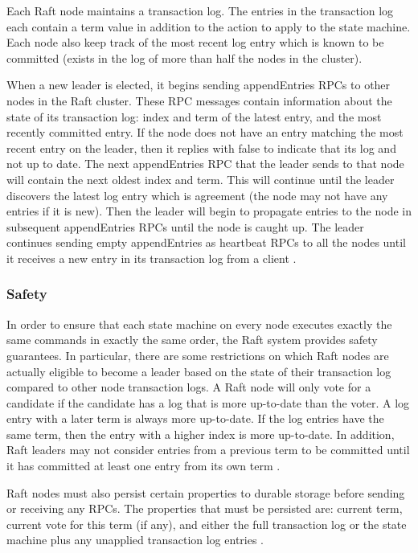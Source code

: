 \documentclass[9pt]{extarticle}
\begin{document}
\begin{multicols}{2}
Each Raft node maintains a transaction log. The entries in the
transaction log each contain a term value in addition to the action to
apply to the state machine. Each node also keep track of the most
recent log entry which is known to be committed (exists in the log of
more than half the nodes in the cluster).

When a new leader is elected, it begins sending appendEntries RPCs
to other nodes in the Raft cluster. These RPC messages contain
information about the state of its transaction log: index and term of
the latest entry, and the most recently committed entry. If the node
does not have an entry matching the most recent entry on the leader,
then it replies with false to indicate that its log and not up to
date. The next appendEntries RPC that the leader sends to that
node will contain the next oldest index and term. This will continue
until the leader discovers the latest log entry which is agreement
(the node may not have any entries if it is new). Then the leader will
begin to propagate entries to the node in subsequent appendEntries
RPCs until the node is caught up. The leader continues sending
empty appendEntries as heartbeat RPCs to all the nodes until it
receives a new entry in its transaction log from a client
\cite[Section~3.5]{raft_thesis:ongaro14}.

\subsubsection{Safety}

In order to ensure that each state machine on every node executes
exactly the same commands in exactly the same order, the Raft system
provides safety guarantees. In particular, there are some restrictions
on which Raft nodes are actually eligible to become a leader based on
the state of their transaction log compared to other node transaction
logs. A Raft node will only vote for a candidate if the candidate has
a log that is more up-to-date than the voter. A log entry with a later
term is always more up-to-date. If the log entries have the same term,
then the entry with a higher index is more up-to-date. In addition,
Raft leaders may not consider entries from a previous term to be
committed until it has committed at least one entry from its own
term
\cite[Section~3.6]{raft_thesis:ongaro14}.

Raft nodes must also persist certain properties to durable storage
before sending or receiving any RPCs. The properties that must be
persisted are: current term, current vote for this term (if any), and
either the full transaction log or the state machine plus any
unapplied transaction log entries
\cite[Section~3.8]{raft_thesis:ongaro14}.


\end{multicols}
\end{document}
